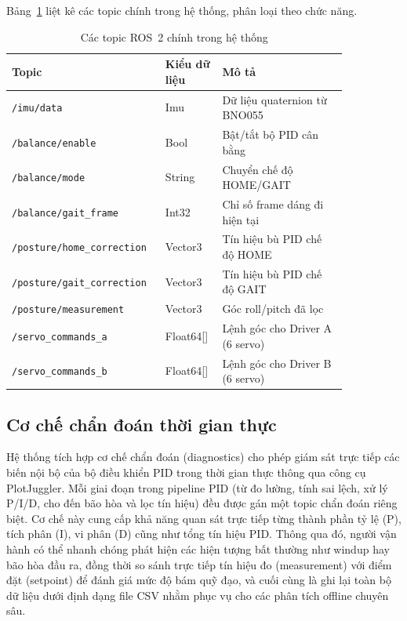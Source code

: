 Bảng~\ref{tab:ros2_topics} liệt kê các topic chính trong hệ thống, phân loại theo chức năng.

\begin{table}[H]
\centering
\caption{Các topic ROS~2 chính trong hệ thống}
\label{tab:ros2_topics}
\renewcommand{\arraystretch}{1.3}
\begin{tabular}{|p{0.35\linewidth}|p{0.15\linewidth}|p{0.35\linewidth}|}
\hline
\textbf{Topic} & \textbf{Kiểu dữ liệu} & \textbf{Mô tả} \\ \hline
\texttt{/imu/data} & Imu & Dữ liệu quaternion từ BNO055 \\ \hline
\texttt{/balance/enable} & Bool & Bật/tắt bộ PID cân bằng \\ \hline
\texttt{/balance/mode} & String & Chuyển chế độ HOME/GAIT \\ \hline
\texttt{/balance/gait\_frame} & Int32 & Chỉ số frame dáng đi hiện tại \\ \hline
\texttt{/posture/home\_correction} & Vector3 & Tín hiệu bù PID chế độ HOME \\ \hline
\texttt{/posture/gait\_correction} & Vector3 & Tín hiệu bù PID chế độ GAIT \\ \hline
\texttt{/posture/measurement} & Vector3 & Góc roll/pitch đã lọc \\ \hline
\texttt{/servo\_commands\_a} & Float64[] & Lệnh góc cho Driver A (6 servo) \\ \hline
\texttt{/servo\_commands\_b} & Float64[] & Lệnh góc cho Driver B (6 servo) \\ \hline
\end{tabular}
\end{table}

\subsection{Cơ chế chẩn đoán thời gian thực}

Hệ thống tích hợp cơ chế chẩn đoán (diagnostics) cho phép giám sát trực tiếp các biến nội bộ của bộ điều khiển PID trong thời gian thực thông qua công cụ PlotJuggler. Mỗi giai đoạn trong pipeline PID (từ đo lường, tính sai lệch, xử lý P/I/D, cho đến bão hòa và lọc tín hiệu) đều được gán một topic chẩn đoán riêng biệt. Cơ chế này cung cấp khả năng quan sát trực tiếp từng thành phần tỷ lệ (P), tích phân (I), vi phân (D) cũng như tổng tín hiệu PID. Thông qua đó, người vận hành có thể nhanh chóng phát hiện các hiện tượng bất thường như windup hay bão hòa đầu ra, đồng thời so sánh trực tiếp tín hiệu đo (measurement) với điểm đặt (setpoint) để đánh giá mức độ bám quỹ đạo, và cuối cùng là ghi lại toàn bộ dữ liệu dưới định dạng file CSV nhằm phục vụ cho các phân tích offline chuyên sâu.

